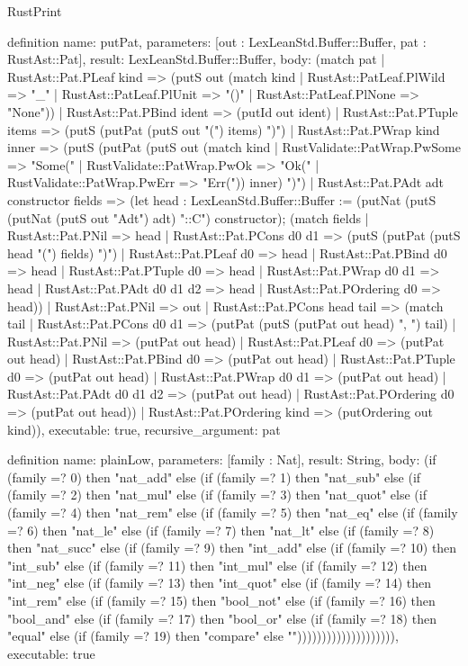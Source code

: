 \begin{lexlean}{RustPrint}
\begin{semanticmodule}
definition{
  name: putPat,
  parameters: [out : LexLeanStd.Buffer::Buffer, pat : RustAst::Pat],
  result: LexLeanStd.Buffer::Buffer,
  body: (match pat
    | RustAst::Pat.PLeaf kind => (putS out (match kind
      | RustAst::PatLeaf.PlWild => "_"
      | RustAst::PatLeaf.PlUnit => "()"
      | RustAst::PatLeaf.PlNone => "None"))
    | RustAst::Pat.PBind ident => (putId out ident)
    | RustAst::Pat.PTuple items => (putS (putPat (putS out "(") items) ")")
    | RustAst::Pat.PWrap kind inner => (putS (putPat (putS out (match kind
      | RustValidate::PatWrap.PwSome => "Some("
      | RustValidate::PatWrap.PwOk => "Ok("
      | RustValidate::PatWrap.PwErr => "Err(")) inner) ")")
    | RustAst::Pat.PAdt adt constructor fields => (let head : LexLeanStd.Buffer::Buffer := (putNat (putS (putNat (putS out "Adt") adt) "::C") constructor); (match fields
      | RustAst::Pat.PNil => head
      | RustAst::Pat.PCons d0 d1 => (putS (putPat (putS head "(") fields) ")")
      | RustAst::Pat.PLeaf d0 => head
      | RustAst::Pat.PBind d0 => head
      | RustAst::Pat.PTuple d0 => head
      | RustAst::Pat.PWrap d0 d1 => head
      | RustAst::Pat.PAdt d0 d1 d2 => head
      | RustAst::Pat.POrdering d0 => head))
    | RustAst::Pat.PNil => out
    | RustAst::Pat.PCons head tail => (match tail
      | RustAst::Pat.PCons d0 d1 => (putPat (putS (putPat out head) ", ") tail)
      | RustAst::Pat.PNil => (putPat out head)
      | RustAst::Pat.PLeaf d0 => (putPat out head)
      | RustAst::Pat.PBind d0 => (putPat out head)
      | RustAst::Pat.PTuple d0 => (putPat out head)
      | RustAst::Pat.PWrap d0 d1 => (putPat out head)
      | RustAst::Pat.PAdt d0 d1 d2 => (putPat out head)
      | RustAst::Pat.POrdering d0 => (putPat out head))
    | RustAst::Pat.POrdering kind => (putOrdering out kind)),
  executable: true,
  recursive_argument: pat
}

definition{
  name: plainLow,
  parameters: [family : Nat],
  result: String,
  body: (if (family =? 0) then "nat_add" else (if (family =? 1) then "nat_sub" else (if (family =? 2) then "nat_mul" else (if (family =? 3) then "nat_quot" else (if (family =? 4) then "nat_rem" else (if (family =? 5) then "nat_eq" else (if (family =? 6) then "nat_le" else (if (family =? 7) then "nat_lt" else (if (family =? 8) then "nat_succ" else (if (family =? 9) then "int_add" else (if (family =? 10) then "int_sub" else (if (family =? 11) then "int_mul" else (if (family =? 12) then "int_neg" else (if (family =? 13) then "int_quot" else (if (family =? 14) then "int_rem" else (if (family =? 15) then "bool_not" else (if (family =? 16) then "bool_and" else (if (family =? 17) then "bool_or" else (if (family =? 18) then "equal" else (if (family =? 19) then "compare" else "")))))))))))))))))))),
  executable: true
}


\end{semanticmodule}
\end{lexlean}
